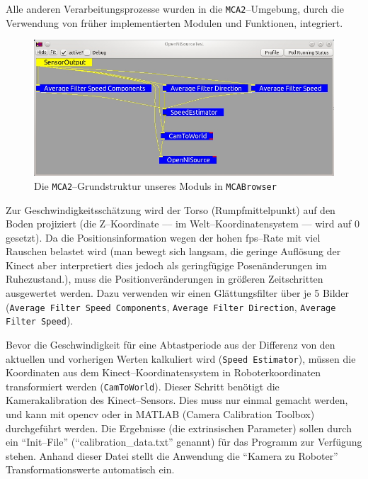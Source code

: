 Alle anderen Verarbeitungsprozesse wurden in die \lstinline{MCA2}--Umgebung,
durch die Verwendung von früher implementierten Modulen und Funktionen, integriert.

\begin{figure}[h]
	\center
	\includegraphics[scale=0.5]{graphics/OpenNISourceTest.jpg}
	\caption{\label{fig:OpenNISourceTest} Die \lstinline{MCA2}--Grundstruktur unseres Moduls in \lstinline{MCABrowser}}
\end{figure}

Zur Geschwindigkeitsschätzung wird der Torso (Rumpfmittelpunkt) auf den Boden projiziert
 (die Z--Koordinate --– im Welt--Koordinatensystem --- wird auf 0 gesetzt). Da die
 Positionsinformation wegen der hohen \gls{fps}--Rate mit viel Rauschen belastet wird
 (man bewegt sich langsam, die geringe Auflösung der Kinect aber interpretiert
 dies jedoch als geringfügige Posenänderungen im Ruhezustand.), muss die Positionveränderungen
 in größeren Zeitschritten ausgewertet werden. Dazu verwenden wir einen Glättungsfilter über
 je 5 Bilder (\lstinline{Average Filter Speed Components}, \lstinline{Average Filter Direction}, \lstinline{Average Filter Speed}).
 
Bevor die Geschwindigkeit für eine Abtastperiode aus der Differenz von den
aktuellen und vorherigen Werten kalkuliert wird (\lstinline{Speed Estimator}),
müssen die Koordinaten aus dem Kinect--Koordinatensystem in Roboterkoordinaten transformiert werden
 (\lstinline{CamToWorld}). Dieser Schritt benötigt die Kamerakalibration des
 Kinect--Sensors. Dies muss nur einmal gemacht werden, und kann mit \gls{opencv} oder
 in MATLAB (Camera Calibration Toolbox) durchgeführt werden. Die Ergebnisse (die extrinsischen Parameter)
 sollen durch ein ``Init--File'' (``calibration\_data.txt'' genannt) für das
 Programm zur Verfügung stehen.
 Anhand dieser Datei stellt die Anwendung die ``Kamera zu Roboter'' Transformationswerte automatisch ein.
 
